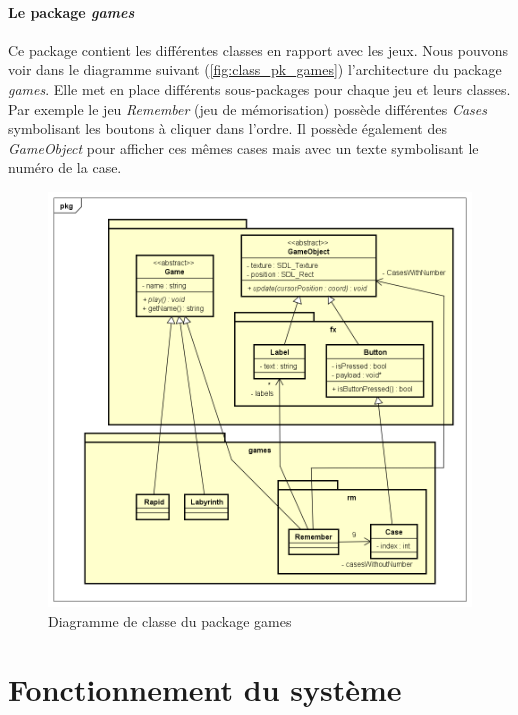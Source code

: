 \documentclass{polytech/polytech}
\begin{document}
\pagebreak
\paragraph{Le package \textit{games}}
Ce package contient les différentes classes en rapport avec les jeux. Nous pouvons voir dans le diagramme suivant (\autoref{fig:class_pk_games}) l'architecture du package \textit{games}. Elle met en place différents sous-packages pour chaque jeu et leurs classes.  Par exemple le jeu \textit{Remember} (jeu de mémorisation) possède différentes \textit{Cases} symbolisant les boutons à cliquer dans l'ordre. Il possède également des \textit{GameObject} pour afficher ces mêmes cases mais avec un texte symbolisant le numéro de la case.

\begin{figure}
    \centering
    \includegraphics[width=13cm]{img/diagrammes/classPkGames.png}
    \caption{Diagramme de classe du package games}
    \label{fig:class_pk_games}
\end{figure}


\section{Fonctionnement du système}
\end{document}
